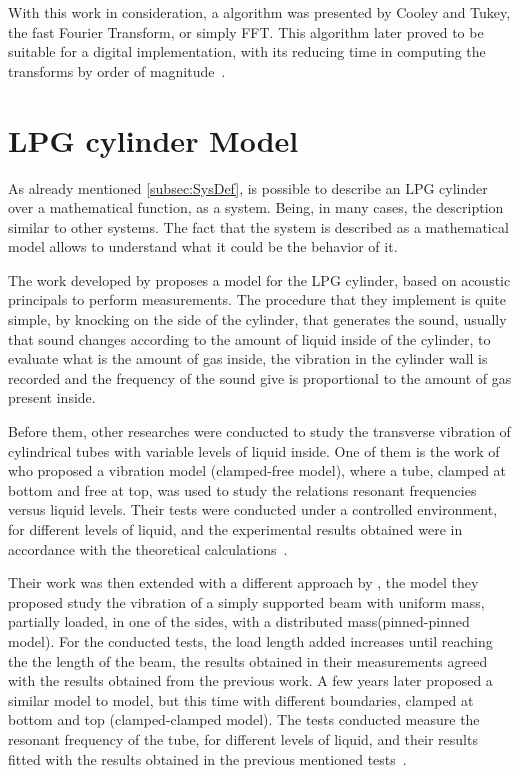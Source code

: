 With this work in consideration, a algorithm was presented by Cooley and Tukey, the fast Fourier Transform, or simply FFT. This algorithm later proved to be suitable for a digital implementation, with its reducing time in computing the transforms by order of magnitude~\cite{oppenheimSignalsSystems1997}.



\section{LPG cylinder Model}\label{sec:LPGModel}
As already mentioned \ref{subsec:SysDef}, is possible to describe an LPG cylinder over a mathematical function, as a system. Being, in many cases, the description similar to other systems. The fact that the system is described as a mathematical model allows to understand what it could be the behavior of it. 

The work developed by \citeauthor{wuLiquidLevelDetector2014b} proposes a model for the LPG cylinder, based on acoustic principals to perform measurements. The procedure that they implement is quite simple, by knocking on the side of the cylinder, that generates the sound, usually that sound changes according to the amount of liquid inside of the cylinder, to evaluate what is the amount of gas inside, the vibration in the cylinder wall is recorded and the frequency of the sound give is proportional to the amount of gas present inside.

Before them, other researches were conducted to study the transverse vibration of cylindrical tubes with variable levels of liquid inside. One of them is the work of \citeauthor{chanFreeVibrationCantilever1995} who proposed a vibration model (clamped-free model), where a tube, clamped at bottom and free at top, was used to study the relations resonant frequencies versus liquid levels. Their tests were conducted under a controlled environment, for different levels of liquid, and the experimental results obtained were in accordance with the theoretical calculations~\cite{chanFreeVibrationCantilever1995}.

Their work was then extended with a different approach by \citeauthor{chanFREEVIBRATIONSIMPLY1996}, the model they proposed study the vibration of a simply supported beam with uniform mass, partially loaded, in one of the sides, with a distributed mass(pinned-pinned model). For the conducted tests, the load length added increases until reaching the the length of the beam, the results obtained in their measurements agreed with the results obtained from the previous work\cite{chanFREEVIBRATIONSIMPLY1996}. 
A few years later \citeauthor{jacobsContactlessLiquidDetection2005} proposed a similar model to \citeauthor{chanFreeVibrationCantilever1995} model, but this time with different boundaries, clamped at bottom and top (clamped-clamped model). The tests conducted measure the resonant frequency of the tube, for different levels of liquid, and their results fitted with the results obtained in the previous mentioned tests~\cite{jacobsContactlessLiquidDetection2005}.

